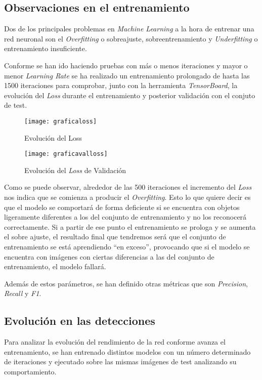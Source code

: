 \subsection{Observaciones en el entrenamiento}

Dos de los principales problemas en \emph{Machine Learning} a la hora de entrenar una red neuronal son el \emph{Overfitting} o sobreajuste, sobreentrenamiento y \emph{Underfitting} o entrenamiento insuficiente.

Conforme se han ido haciendo pruebas con más o menos iteraciones y mayor o menor \emph{Learning Rate} se ha realizado un entrenamiento prolongado de hasta las 1500 iteraciones para comprobar, junto con la herramienta \emph{TensorBoard}, la evolución del \emph{Loss} durante el entrenamiento y posterior validación con el conjuto de test.

\begin{figure}[htb]
\texttt{[image: graficaloss]}
\caption[Evolución del Loss]{Evolución del Loss}
\end{figure}

\begin{figure}[htb]
\texttt{[image: graficavalloss]}
\caption[Evolución del \emph{Loss} de Validación]{Evolución del \emph{Loss} de Validación}
\end{figure}

Como se puede observar, alrededor de las 500 iteraciones el incremento del \emph{Loss} nos indica que se comienza a producir el \emph{Overfitting}. Esto lo que quiere decir es que el modelo se comportará de forma deficiente si se encuentra con objetos ligeramente diferentes a los del conjunto de entrenamiento y no los reconocerá correctamente.
Si a partir de ese punto el entrenamiento se prologa y se aumenta el sobre ajuste, el resultado final que tendremos será que el conjunto de entrenamiento se está aprendiendo ``en exceso'', provocando que si el modelo se encuentra con imágenes con ciertas diferencias a las del conjunto de entrenamiento, el modelo fallará.

Además de estos parámetros, se han definido otras métricas que son \emph{Precision}, \emph{Recall} y \emph{F1}.

\subsection{Evolución en las detecciones}

Para analizar la evolución del rendimiento de la red conforme avanza el entrenamiento, se han entrenado distintos modelos con un número determinado de iteraciones y ejecutado sobre las mismas imágenes de test analizando su comportamiento. 

